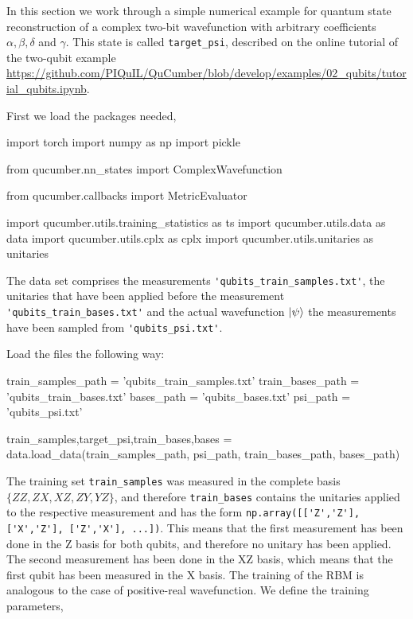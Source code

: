\documentclass[submission, Phys]{SciPost}
\begin{document}
In this section we work through a simple numerical example for quantum state reconstruction of a complex two-bit wavefunction with arbitrary coefficients $\alpha, \beta, \delta$ and $\gamma$.  This state is called \verb|target_psi|, described on the online tutorial of the two-qubit example \url{https://github.com/PIQuIL/QuCumber/blob/develop/examples/02_qubits/tutorial_qubits.ipynb}.


First we load the packages needed,

\begin{python}
import torch
import numpy as np
import pickle

from qucumber.nn_states import ComplexWavefunction

from qucumber.callbacks import MetricEvaluator

import qucumber.utils.training_statistics as ts
import qucumber.utils.data as data              
import qucumber.utils.cplx as cplx              
import qucumber.utils.unitaries as unitaries
\end{python}


The data set comprises the measurements \verb|'qubits_train_samples.txt'|, the unitaries that have been applied before the measurement \verb|'qubits_train_bases.txt'| and the actual wavefunction $\ket{\psi}$ the measurements have been sampled from \verb|'qubits_psi.txt'|.

Load the files the following way:

\begin{python}
train_samples_path = 'qubits_train_samples.txt'
train_bases_path   = 'qubits_train_bases.txt'
bases_path         = 'qubits_bases.txt'
psi_path           = 'qubits_psi.txt'

train_samples,target_psi,train_bases,bases = data.load_data(train_samples_path, psi_path, train_bases_path, bases_path)
\end{python}


The training set \verb|train_samples| was measured in the complete basis $\{ZZ, ZX, XZ, ZY, YZ \}$, and therefore \verb|train_bases| contains the unitaries applied to the respective measurement and has the form \verb|np.array([['Z','Z'], ['X','Z'], ['Z','X'], ...])|.
This means that the first measurement has been done in the Z basis for both qubits,
and therefore no unitary has been applied. The second measurement has been done in the XZ basis,
which means that the first qubit has been measured in the X basis. The training of the RBM is analogous to the case of positive-real wavefunction.
We define the training parameters,
\end{document}
